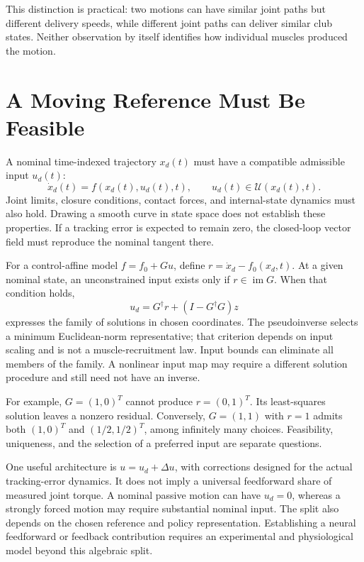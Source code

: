 \documentclass[12pt, openany]{book}
\theoremstyle{plain}
\begin{document}
This distinction is practical: two motions can have similar joint paths but
different delivery speeds, while different joint paths can deliver similar
club states. Neither observation by itself identifies how individual muscles
produced the motion.

\section{A Moving Reference Must Be Feasible}

A nominal time-indexed trajectory $x_d(t)$ must have a compatible admissible
input $u_d(t)$:
\begin{equation}
 \dot x_d(t)=f(x_d(t),u_d(t),t),\qquad u_d(t)\in\mathcal U(x_d(t),t).
 \label{eq:motion_nominal_feasibility}
\end{equation}
Joint limits, closure conditions, contact forces, and internal-state dynamics
must also hold. Drawing a smooth curve in state space does not establish these
properties. If a tracking error is expected to remain zero, the closed-loop
vector field must reproduce the nominal tangent there.

For a control-affine model $f=f_0+Gu$, define
$r=\dot x_d-f_0(x_d,t)$. At a given nominal state, an unconstrained input exists
only if $r\in\operatorname{im}G$. When that condition holds,
\begin{equation}
 u_d=G^\dagger r+(I-G^\dagger G)z
 \label{eq:motion_feedforward_family}
\end{equation}
expresses the family of solutions in chosen coordinates. The pseudoinverse
selects a minimum Euclidean-norm representative; that criterion depends on
input scaling and is not a muscle-recruitment law. Input bounds can eliminate
all members of the family. A nonlinear input map may require a different
solution procedure and still need not have an inverse.

For example, $G=(1,0)^T$ cannot produce $r=(0,1)^T$. Its least-squares solution
leaves a nonzero residual. Conversely, $G=(1,1)$ with $r=1$ admits both
$(1,0)^T$ and $(1/2,1/2)^T$, among infinitely many choices. Feasibility,
uniqueness, and the selection of a preferred input are separate questions.

One useful architecture is $u=u_d+\Delta u$, with corrections designed for the
actual tracking-error dynamics. It does not imply a universal feedforward share
of measured joint torque. A nominal passive motion can have $u_d=0$, whereas
a strongly forced motion may require substantial nominal input. The split also
depends on the chosen reference and policy representation. Establishing a neural
feedforward or feedback contribution requires an experimental and physiological
model beyond this algebraic split.
\end{document}
